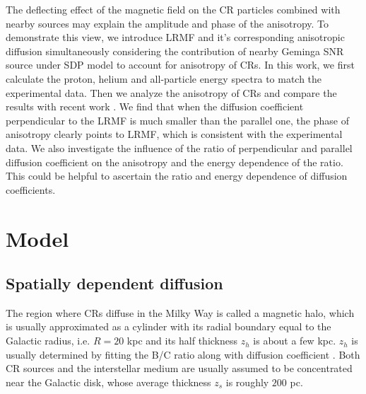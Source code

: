 \documentclass[a4paper,11pt]{article}
\begin{document}
The deflecting effect of the magnetic field on the CR particles combined with nearby sources may explain the amplitude and phase of the anisotropy.
To demonstrate  this view, we introduce LRMF and it's corresponding anisotropic diffusion simultaneously considering the contribution of nearby Geminga SNR source under SDP model to account for anisotropy of CRs.
In this work, we first calculate the proton, helium and all-particle energy spectra to match the experimental data. 
Then we analyze the anisotropy of CRs and compare the results with recent work \citep{2019JCAP...10..010L}. 
We find that when the diffusion coefficient perpendicular to the LRMF is much smaller than the parallel one, the phase of anisotropy clearly points to LRMF, which is consistent with the experimental data.
We also investigate the influence of the ratio of perpendicular and parallel  diffusion coefficient  on the anisotropy  and the energy dependence of the ratio.
This could be helpful to ascertain the ratio and  energy dependence of diffusion coefficients.




\section{ Model}\label{sec: Model}
\subsection{Spatially dependent diffusion}

The region where CRs diffuse in the Milky Way is called a magnetic halo, which is usually approximated as a cylinder with its radial boundary equal to the 
Galactic radius, i.e. $R = 20$ kpc and its half thickness $z_h$ is about a few kpc. $z_h$  is  usually  determined by fitting the B/C ratio along with diffusion coefficient \citep {2007ARNPS..57..285S}. Both CR sources and the interstellar medium 
are usually assumed to be concentrated near the Galactic disk, whose average thickness $z_s$  is roughly $200$ pc. 
\end{document}
